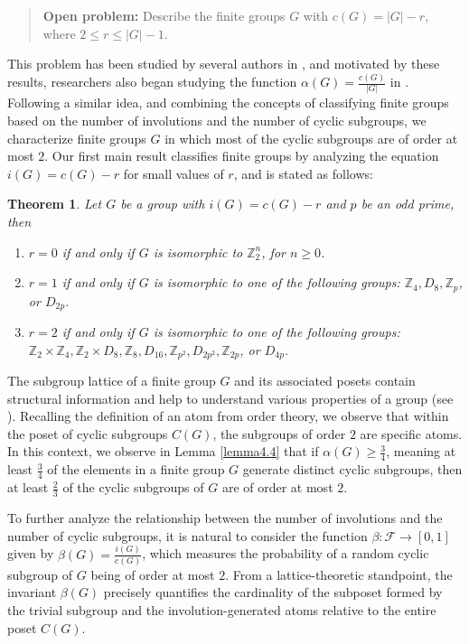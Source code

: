 \documentclass[a4paper,11pt]{amsart}
\numberwithin{equation}{section}
\numberwithin{equation}{subsection}
\newtheorem{theorem}{Theorem}[section]
\begin{document}
\begin{quote}
    \textbf{Open problem:} Describe the finite groups $G$ with $c(G) = |G|-r$, where $2 \le r \le |G|-1$.
\end{quote}
This problem has been studied by several authors in \cite{AA, AA1, RJL, LCQ,CHS, SR1, SR, MT1}, and motivated by these results, researchers also began studying the function $\alpha(G) = \frac{c(G)}{|G|}$ in \cite{GS, GL, ML}. Following a similar idea, and combining the concepts of classifying finite groups based on the number of involutions and the number of cyclic subgroups, we characterize finite groups $G$ in which most of the cyclic subgroups are of order at most $2$. Our first main result classifies finite groups by analyzing the equation $i(G) = c(G) - r$ for small values of $r$, and is stated as follows:


\begin{theorem}\label{mainresult}
    Let $G$ be a group with $i(G)=c(G)-r$ and $p$ be an odd prime, then
    \begin{enumerate}
        \item $r=0$ if and only if $G$ is isomorphic to $\mathbb{Z}_{2}^{n}$, for $n\geq 0$.
        \item $r=1$ if and only if $G$ is isomorphic to one of the following groups: $\mathbb{Z}_4, D_8, \mathbb{Z}_p$, or $D_{2p}$.
        \item $r=2$ if and only if $G$ is isomorphic to one of the following groups: $\mathbb{Z}_2\times\mathbb{Z}_{4}, \mathbb{Z}_2\times D_{8}, \mathbb{Z}_8, D_{16}, \mathbb{Z}_{p^2}, D_{2p^2}, \mathbb{Z}_{2p}$, or $D_{4p}$.
    \end{enumerate}
\end{theorem}

The subgroup lattice of a finite group $G$ and its associated posets contain structural information and help to understand various properties of a group (see \cite{RS1}). Recalling the definition of an atom from order theory, we observe that within the poset of cyclic subgroups $C(G)$, the subgroups of order $2$ are specific atoms. In this context, we observe in Lemma \ref{lemma4.4} that if $\alpha(G) \ge \frac{3}{4}$, meaning at least $\frac{3}{4}$ of the elements in a finite group $G$ generate distinct cyclic subgroups, then at least $\frac{2}{3}$ of the cyclic subgroups of $G$ are of order at most $2$.


To further analyze the relationship between the number of involutions and the number of cyclic subgroups, it is natural to consider the function $\beta: \mathcal{F}\to [0,1]$ given by $\beta(G)=\frac{i(G)}{c(G)}$, which measures the probability of a random cyclic subgroup of $G$ being of order at most $2$. From a lattice-theoretic standpoint, the invariant $\beta(G)$ precisely quantifies the cardinality of the subposet formed by the trivial subgroup and the involution-generated atoms relative to the entire poset $C(G)$.
\end{document}
